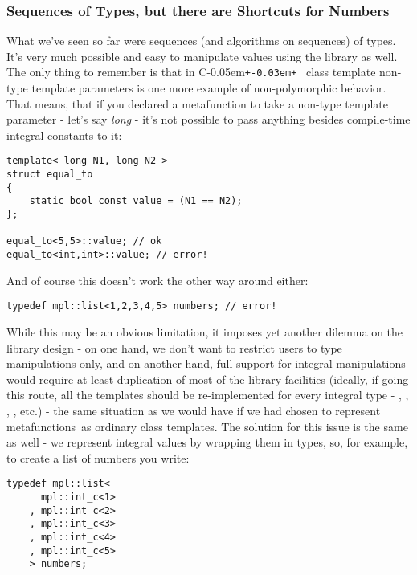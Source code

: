 \documentclass{kapproc}
\newcommand{\Cpp}{C\kern-0.05em\texttt{+\kern-0.03em+}%
}
\newcommand{\mfns}{meta\-func\-tions}
\begin{document}
\subsubsection{Sequences of Types, but there are Shortcuts for Numbers}

What we've seen so far were sequences (and algorithms on 
sequences) of types. It's very much possible and easy to 
manipulate values using the library as well. The only thing 
to remember is that in \Cpp\ class template non-type template 
parameters is one more example of non-polymorphic behavior. %
That means, that if you declared a metafunction to take a 
non-type template parameter - let's say \emph{long} - 
it's not possible to pass anything besides compile-time 
integral constants to it:

{\small
\begin{codesamp}\begin{verbatim}
template< long N1, long N2 >
struct equal_to
{
    static bool const value = (N1 == N2);
};

equal_to<5,5>::value; // ok
equal_to<int,int>::value; // error!
\end{verbatim}
\end{codesamp}
}

And of course this doesn't work the other way around either:

{\small
\begin{codesamp}\begin{verbatim}
typedef mpl::list<1,2,3,4,5> numbers; // error!
\end{verbatim}
\end{codesamp}
}

While this may be an obvious limitation, it imposes yet 
another dilemma on the library design - on one hand, we don't 
want to restrict users to type manipulations only, and on another 
hand, full support for integral manipulations would require at 
least duplication of most of the library facilities (ideally, 
if going this route, all the templates should be re-implemented 
for every integral type - , , ,
, etc.) - the same situation as we would have if we 
had chosen to represent \mfns\ as ordinary class templates.
The solution for this issue is the same as well - we represent 
integral values by wrapping them in types, so, for example, to 
create a list of numbers you write:

{\small
\begin{codesamp}\begin{verbatim}
typedef mpl::list<
      mpl::int_c<1>
    , mpl::int_c<2>
    , mpl::int_c<3>
    , mpl::int_c<4>
    , mpl::int_c<5>
    > numbers;
\end{verbatim}
\end{codesamp}
}
\end{document}
